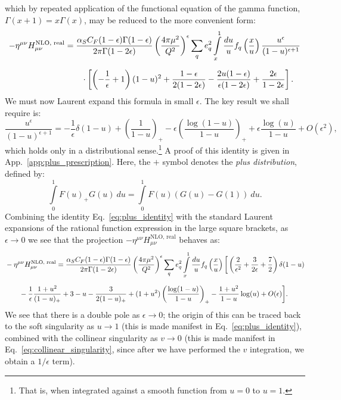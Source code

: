 \documentclass[withindex,glossary]{cam-thesis}
\begin{document}
which by repeated application of the functional equation of the gamma function, $\Gamma(x+1) = x\Gamma(x)$, may be reduced to the more convenient form:
\begin{align}
-\eta^{\mu\nu} H_{\mu\nu}^{\text{NLO, real}} &= \frac{\alpha_S C_F  (1-\epsilon) \Gamma(1-\epsilon)}{2\pi \Gamma(1 - 2\epsilon)} \left( \frac{4\pi \mu^2}{Q^2} \right)^{\epsilon} \sum_{q} e_q^2 \int\limits_{x}^{1} \frac{du}{u} f_q\left( \frac{x}{u} \right) \frac{u^{\epsilon}}{(1-u)^{\epsilon+1}} \notag\\[1.5ex]
&\qquad \cdot \left[ \left( -\frac{1}{\epsilon} + 1\right)(1-u)^2 +  \frac{1-\epsilon}{2(1-2\epsilon)} - \frac{2u(1-\epsilon)}{\epsilon(1-2\epsilon)} + \frac{2\epsilon}{1 - 2\epsilon} \right].
\label{eq:collinear_singularity}
\end{align}
We must now Laurent expand this formula in small $\epsilon$. The key result we shall require is:
\begin{equation}
\label{eq:plus_identity}
\frac{u^{\epsilon}}{(1-u)^{\epsilon+1}} = -\frac{1}{\epsilon} \delta(1-u) + \left( \frac{1}{1-u} \right)_+ - \epsilon \left( \frac{\log(1-u)}{1-u} \right)_+ + \epsilon \frac{\log(u)}{1-u} + O(\epsilon^2),
\end{equation}
which holds only in a distributional sense.\footnote{That is, when integrated against a smooth function from $u=0$ to $u=1$.} A proof of this identity is given in App.~\ref{app:plus_prescription}. Here, the $+$ symbol denotes the \textit{plus distribution}, defined by:
\begin{equation}
\int\limits_{0}^{1} F(u)_+ G(u)\ du = \int\limits_{0}^{1} F(u)(G(u) - G(1))\ du.
\end{equation}
Combining the identity Eq.~\eqref{eq:plus_identity} with the standard Laurent expansions of the rational function expression in the large square brackets, as $\epsilon \rightarrow 0$ we see that the projection $-\eta^{\mu\nu} H_{\mu\nu}^{\text{NLO, real}}$ behaves as:
\begin{align}
&-\eta^{\mu\nu} H_{\mu\nu}^{\text{NLO, real}} = \frac{\alpha_S C_F  (1-\epsilon) \Gamma(1-\epsilon)}{2\pi \Gamma(1 - 2\epsilon)} \left( \frac{4\pi \mu^2}{Q^2} \right)^{\epsilon} \sum_{q} e_q^2 \int\limits_{x}^{1} \frac{du}{u} f_q\left( \frac{x}{u} \right) \bigg[ \left( \frac{2}{\epsilon^2} + \frac{3}{2\epsilon} + \frac{7}{2} \right) \delta(1-u) \notag\\[1.5ex]
&\qquad- \frac{1}{\epsilon} \frac{1 + u^2}{(1-u)_+} + 3 - u - \frac{3}{2(1-u)_+} + (1+u^2) \left( \frac{\log(1-u)}{1-u} \right)_+ - \frac{1+u^2}{1-u} \log(u) + O(\epsilon)\bigg].
\end{align}
We see that there is a double pole as $\epsilon \rightarrow 0$; the origin of this can be traced back to the soft singularity as $u\rightarrow 1$ (this is made manifest in Eq.~\eqref{eq:plus_identity}), combined with the collinear singularity as $v \rightarrow 0$ (this is made manifest in Eq.~\eqref{eq:collinear_singularity}, since after we have performed the $v$ integration, we obtain a $1/\epsilon$ term).\\
\end{document}
